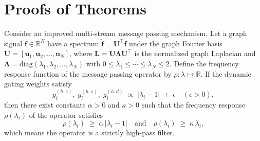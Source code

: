 \section{Proofs of Theorems}
\label{appendix_theorems}
\begin{theorem}
\label{thm:bias}
Consider an improved multi-stream message passing mechanism. 
Let a graph signal $\mathbf{f} \in \mathbb{R}^N$ have a spectrum 
$\hat{\mathbf{f}} = \mathbf{U}^\top \mathbf{f}$ 
under the graph Fourier basis 
$\mathbf{U} = [\mathbf{u}_1, \mathbf{u}_2, \ldots, \mathbf{u}_N]$, 
where 
$\mathbf{L} = \mathbf{U}\boldsymbol{\Lambda} \mathbf{U}^\top$ 
is the normalized graph Laplacian and 
$\boldsymbol{\Lambda} = \mathrm{diag}(\lambda_1, \lambda_2, \ldots, \lambda_N)$ 
with 
$0 \le \lambda_1 \le \cdots \le \lambda_N \le 2.$ 
Define the frequency response function of the message passing operator 
by $\rho: \lambda \mapsto \mathbb{R}.$ 
If the dynamic gating weights satisfy
\begin{equation}
g^{(h,e)}_i, \; g^{(h,s)}_i, \; g^{(h,d)}_i 
\;\propto\; 
\bigl|\lambda_i - 1\bigr| \;+\; \epsilon
\quad (\epsilon > 0),
\end{equation}
then there exist constants $\alpha > 0$ and $\kappa > 0$ such that 
the frequency response $\rho(\lambda_i)$ of the operator satisfies
\begin{equation}
\rho(\lambda_i) \;\ge\; \alpha\,\bigl|\lambda_i - 1\bigr|
\quad \text{and} \quad
\rho(\lambda_i) \;\ge\; \kappa\,\lambda_i,
\end{equation}
which means the operator is a strictly high-pass filter.
\end{theorem}

